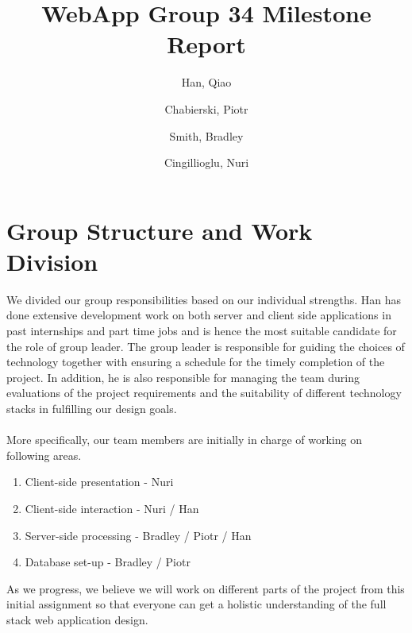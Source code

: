 \documentclass[10pt,a4paper]{article}
\begin{document}
\title{WebApp Group 34 Milestone Report}
\author{
  Han, Qiao\\
  \and
  Chabierski, Piotr\\
  \and
  Smith, Bradley\\
  \and
  Cingillioglu, Nuri\\
}

\maketitle

\section{Group Structure and Work Division}

\noindent
We divided our group responsibilities based on our individual strengths. Han has done extensive development work on both server and client side applications in past internships and part time jobs and is hence the most suitable candidate for the role of group leader. The group leader is responsible for guiding the choices of technology together with ensuring a schedule for the timely completion of the project. In addition, he is also responsible for managing the team during evaluations of the project requirements and the suitability of different technology stacks in fulfilling our design goals.
\\
\\
\noindent
More specifically, our team members are initially in charge of working on following areas.

\begin{enumerate}
  \item Client-side presentation - Nuri
  \item Client-side interaction - Nuri / Han
  \item Server-side processing - Bradley / Piotr / Han
  \item Database set-up - Bradley / Piotr
\end{enumerate}
\noindent
As we progress, we believe we will work on different parts of the project from this initial assignment so that everyone can get a holistic understanding of the full stack web application design.
\end{document}
